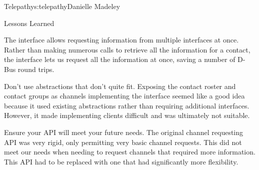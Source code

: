 \begin{aosachapter}{Telepathy}{s:telepathy}{Danielle Madeley}
\begin{aosasect1}{Lessons Learned}
\begin{aosadescription}
  \item{The  interface allows requesting information
    from multiple interfaces at once.}  Rather than making numerous
     calls to retrieve all the information for a contact,
    the  interface lets us request all the information
    at once, saving a number of D-Bus round trips.

  \item{Don't use abstractions that don't quite fit.}  Exposing the
    contact roster and contact groups as channels implementing the
     interface seemed like a good idea because it used
    existing abstractions rather than requiring additional
    interfaces. However, it made implementing clients difficult and
    was ultimately not suitable.

  \item{Ensure your API will meet your future needs.}  The original
    channel requesting API was very rigid, only permitting very basic
    channel requests. This did not meet our needs when needing to
    request channels that required more information. This API had to
    be replaced with one that had significantly more flexibility.

\end{aosadescription}

\end{aosasect1}

\end{aosachapter}
